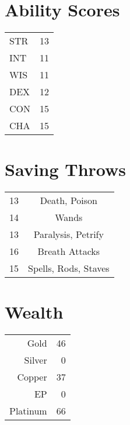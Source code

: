 \documentclass[a4paper]{article}
\begin{document}
\begin{multicols}{2}
\section{Ability Scores}
\begin{table}[H]
    \begin{tabular}{l|r} %
      STR & 13\\
      INT & 11\\
      WIS & 11\\
      DEX & 12\\
      CON & 15\\
      CHA & 15\\
    \end{tabular}
\end{table}

\section{Saving Throws}
\begin{table}[H]
    \begin{tabular}{l|c} %
      13 & Death, Poison\\
      14 & Wands\\
      13 & Paralysis, Petrify\\
      16 & Breath Attacks\\
      15 & Spells, Rods, Staves\\
    \end{tabular}
\end{table}

\section{Wealth}
\begin{table}[H]
    \begin{tabular}{r|r} %
      Gold     & 46\\
      Silver   & 0\\
      Copper   & 37\\
      EP       & 0\\
      Platinum & 66\\
    \end{tabular}
\end{table}


\end{multicols}
\end{document}
